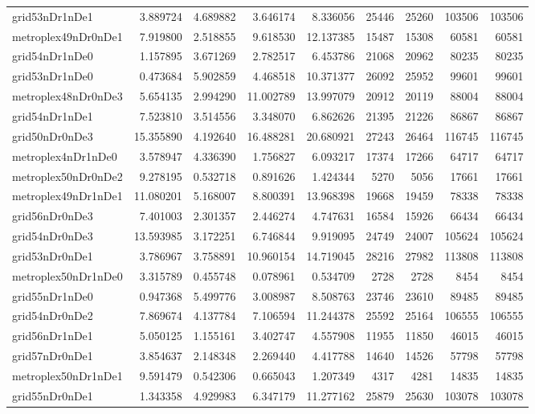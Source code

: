 \begin{longtable}{|l|r|r|r|r|r|r|r|r|}
grid53nDr1nDe1 & 3.889724 & 4.689882 & 3.646174 & 8.336056 & 25446 & 25260 & 103506 & 103506 \\
metroplex49nDr0nDe1 & 7.919800 & 2.518855 & 9.618530 & 12.137385 & 15487 & 15308 & 60581 & 60581 \\
grid54nDr1nDe0 & 1.157895 & 3.671269 & 2.782517 & 6.453786 & 21068 & 20962 & 80235 & 80235 \\
grid53nDr1nDe0 & 0.473684 & 5.902859 & 4.468518 & 10.371377 & 26092 & 25952 & 99601 & 99601 \\
metroplex48nDr0nDe3 & 5.654135 & 2.994290 & 11.002789 & 13.997079 & 20912 & 20119 & 88004 & 88004 \\
grid54nDr1nDe1 & 7.523810 & 3.514556 & 3.348070 & 6.862626 & 21395 & 21226 & 86867 & 86867 \\
grid50nDr0nDe3 & 15.355890 & 4.192640 & 16.488281 & 20.680921 & 27243 & 26464 & 116745 & 116745 \\
metroplex4nDr1nDe0 & 3.578947 & 4.336390 & 1.756827 & 6.093217 & 17374 & 17266 & 64717 & 64717 \\
metroplex50nDr0nDe2 & 9.278195 & 0.532718 & 0.891626 & 1.424344 & 5270 & 5056 & 17661 & 17661 \\
metroplex49nDr1nDe1 & 11.080201 & 5.168007 & 8.800391 & 13.968398 & 19668 & 19459 & 78338 & 78338 \\
grid56nDr0nDe3 & 7.401003 & 2.301357 & 2.446274 & 4.747631 & 16584 & 15926 & 66434 & 66434 \\
grid54nDr0nDe3 & 13.593985 & 3.172251 & 6.746844 & 9.919095 & 24749 & 24007 & 105624 & 105624 \\
grid53nDr0nDe1 & 3.786967 & 3.758891 & 10.960154 & 14.719045 & 28216 & 27982 & 113808 & 113808 \\
metroplex50nDr1nDe0 & 3.315789 & 0.455748 & 0.078961 & 0.534709 & 2728 & 2728 & 8454 & 8454 \\
grid55nDr1nDe0 & 0.947368 & 5.499776 & 3.008987 & 8.508763 & 23746 & 23610 & 89485 & 89485 \\
grid54nDr0nDe2 & 7.869674 & 4.137784 & 7.106594 & 11.244378 & 25592 & 25164 & 106555 & 106555 \\
grid56nDr1nDe1 & 5.050125 & 1.155161 & 3.402747 & 4.557908 & 11955 & 11850 & 46015 & 46015 \\
grid57nDr0nDe1 & 3.854637 & 2.148348 & 2.269440 & 4.417788 & 14640 & 14526 & 57798 & 57798 \\
metroplex50nDr1nDe1 & 9.591479 & 0.542306 & 0.665043 & 1.207349 & 4317 & 4281 & 14835 & 14835 \\
grid55nDr0nDe1 & 1.343358 & 4.929983 & 6.347179 & 11.277162 & 25879 & 25630 & 103078 & 103078 \\

\end{longtable}

